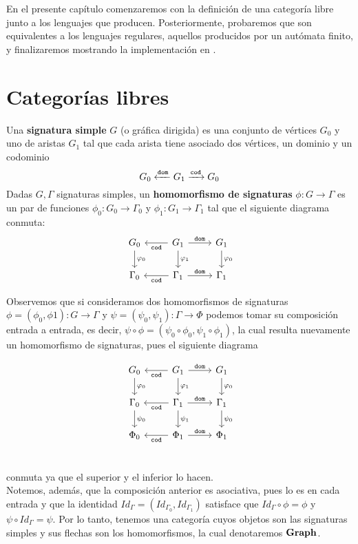 \documentclass[../main.tex]{subfiles}
\begin{document}
	
En el presente capítulo comenzaremos con la definición de una categoría libre junto a los lenguajes que producen. Posteriormente, probaremos que son equivalentes a los lenguajes regulares, aquellos producidos por un autómata finito, y finalizaremos mostrando la implementación en .
\section{Categorías libres}
\begin{dfn}
	Una \textbf{signatura simple} \(G\) (o gráfica dirigida) es una conjunto de vértices \(G_0\) y uno de aristas \(G_1\) tal que cada arista tiene asociado dos vértices, un dominio y un codominio
	$$G_0 \xleftarrow{\tt{dom}} G_1 \xrightarrow{\tt{cod}} G_0$$
	Dadas \( G, \Gamma\) signaturas simples, un \textbf{homomorfismo de signaturas} \( \phi:G \to \Gamma\) es un par de funciones \( \phi_0: G_0 \to \Gamma_0\) y \( \phi_1: G_1 \to \Gamma_1\) tal que el siguiente diagrama conmuta: 
	\[
	\begin{tikzcd}
		G_0 \arrow{d}{\phi_0} & G_1 \arrow{r}{\tt{dom}} \arrow{l}{\tt{cod}} \arrow{d}{\phi_1} & G_1 \arrow{d}{\phi_0} \\
		\Gamma_0 & \Gamma_1 \arrow{r}{\tt{dom}} \arrow{l}{\tt{cod}} & \Gamma_1
	\end{tikzcd}
	\]
\end{dfn}

Observemos que si consideramos dos homomorfismos de signaturas $\phi=(\phi_0, \phi 1): G \to \Gamma$ y $\psi =(\psi _0, \psi_1): \Gamma \to \Phi$ 
podemos tomar su composición entrada a entrada, es decir, $\psi \circ \phi = (\psi_0 \circ \phi_0,\psi_1 \circ \phi_1)$, la  cual resulta nuevamente un homomorfismo de signaturas, pues el siguiente diagrama

\[
\begin{tikzcd}
	G_0 \arrow{d}{\phi_0} & G_1 \arrow{r}{\tt{dom}} \arrow{l}{\tt{cod}} \arrow{d}{\phi_1} & G_1 \arrow{d}{\phi_0} \\
	\Gamma_0 \arrow{d}{\psi_0} & \Gamma_1 \arrow{r}{\tt{dom}} \arrow{l}{\tt{cod}} \arrow{d}{\psi_1} & \Gamma_1 \arrow{d}{\psi_0} \\
	\Phi_0 & \Phi_1 \arrow{r}{\tt{dom}} \arrow{l}{\tt{cod}} & \Phi_1 \\
\end{tikzcd} 
\]

conmuta ya que el superior y el inferior lo hacen. \\
Notemos, además, que la composición anterior es asociativa, pues lo es en cada entrada y que la identidad $Id_\Gamma=(Id_{\Gamma_0}, Id_{\Gamma_1})$ 
satisface que $Id_\Gamma \circ \phi = \phi$ y $\psi \circ Id_\Gamma = \psi$. Por lo tanto, tenemos una categoría cuyos objetos son las signaturas simples y sus flechas son los homomorfismos, la cual denotaremos $\bf{Graph}$. \\
\end{document}
